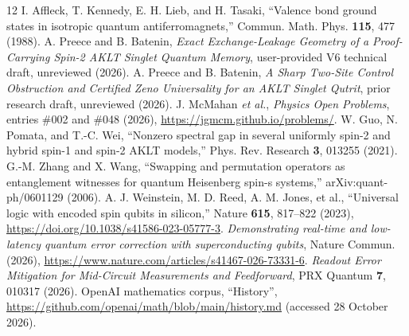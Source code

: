 \documentclass[aps,pra,twocolumn,nofootinbib,superscriptaddress,10pt]{revtex4-2}
\begin{document}
\begin{thebibliography}{12}
 I. Affleck, T. Kennedy, E. H. Lieb, and H. Tasaki, ``Valence bond ground states in isotropic quantum antiferromagnets,'' Commun. Math. Phys. \textbf{115}, 477 (1988).
 A. Preece and B. Batenin, \emph{Exact Exchange-Leakage Geometry of a Proof-Carrying Spin-2 AKLT Singlet Quantum Memory}, user-provided V6 technical draft, unreviewed (2026).
 A. Preece and B. Batenin, \emph{A Sharp Two-Site Control Obstruction and Certified Zeno Universality for an AKLT Singlet Qutrit}, prior research draft, unreviewed (2026).
 J. McMahan \emph{et al.}, \emph{Physics Open Problems}, entries \#002 and \#048 (2026), \url{https://jgmcm.github.io/problems/}.
 W. Guo, N. Pomata, and T.-C. Wei, ``Nonzero spectral gap in several uniformly spin-2 and hybrid spin-1 and spin-2 AKLT models,'' Phys. Rev. Research \textbf{3}, 013255 (2021).
 G.-M. Zhang and X. Wang, ``Swapping and permutation operators as entanglement witnesses for quantum Heisenberg spin-s systems,'' arXiv:quant-ph/0601129 (2006).
 A. J. Weinstein, M. D. Reed, A. M. Jones, et al., ``Universal logic with encoded spin qubits in silicon,'' Nature \textbf{615}, 817--822 (2023), \url{https://doi.org/10.1038/s41586-023-05777-3}.
 \emph{Demonstrating real-time and low-latency quantum error correction with superconducting qubits}, Nature Commun. (2026), \url{https://www.nature.com/articles/s41467-026-73331-6}.
 \emph{Readout Error Mitigation for Mid-Circuit Measurements and Feedforward}, PRX Quantum \textbf{7}, 010317 (2026).
 OpenAI mathematics corpus, ``History'', \url{https://github.com/openai/math/blob/main/history.md} (accessed 28 October 2026).
\end{thebibliography}
\end{document}

